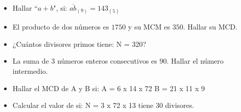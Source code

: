\documentclass[preview,border=12pt,12pt,varwidth]{standalone}
\begin{document}
\begin{itemize}
\item{Hallar ``$a + b$", si: $\overline{ab}_{(9)} = 143_{(5)}$ %
}
\item{El producto de dos números es $1750$ y su MCM es $350$.  Hallar su MCD.
}
\item{¿Cuántos divisores primos tiene: N = 320?
}
\item{La suma de 3 números enteros consecutivos es 90.  Hallar el número intermedio.
}
\item{Hallar el MCD de A y B si:  A = 6 x 14 x 72          B = 21 x 11 x 9
}
\item{Calcular el valor de si: N = 3 x 72 x 13 tiene 30 divisores.
}

\end{itemize}
\end{document}
